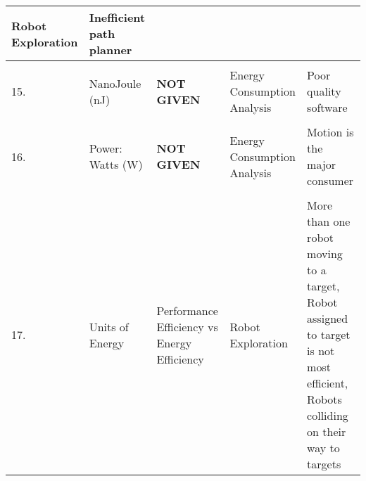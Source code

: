 \begin{table}[h]
\begin{tabular}{p{0.1cm}p{3cm}p{4cm}p{4cm}p{4cm}}
                {Robot Exploration} &
                {Inefficient path planner} \\
            \hline
            \\
            {15.} &
                {NanoJoule (nJ)} &
                {\textbf{NOT GIVEN}} &
                {Energy Consumption Analysis} &
                {Poor quality software} \\
            \hline
            \\
            {16.} &
                {Power: Watts (W)} &
                {\textbf{NOT GIVEN}} &
                {Energy Consumption Analysis} &
                {Motion is the major consumer} \\
            \hline
            \\
            {17.} &
                {Units of Energy} &
                {Performance Efficiency vs Energy Efficiency} &
                {Robot Exploration} &
                {More than one robot moving to a target, 
                Robot assigned to target is not most efficient,
                Robots colliding on their way to targets} \\
        \bottomrule
    \end{tabular}
    \label{table:data_sheet_part_1}
\end{table}